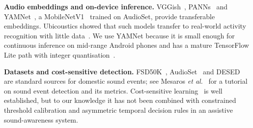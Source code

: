 \documentclass[conference]{IEEEtran}
\begin{document}
\textbf{Audio embeddings and on-device inference.} VGGish~\cite{hershey2017}, PANNs~\cite{kong2020} and YAMNet~\cite{yamnet}, a MobileNetV1~\cite{howard2017} trained on AudioSet, provide transferable embeddings. Ubicoustics showed that such models transfer to real-world activity recognition with little data~\cite{laput2018}. We use YAMNet because it is small enough for continuous inference on mid-range Android phones and has a mature TensorFlow Lite path with integer quantisation~\cite{jacob2018}.

\textbf{Datasets and cost-sensitive detection.} FSD50K~\cite{fonseca2022}, AudioSet~\cite{gemmeke2017} and DESED~\cite{turpault2019} are standard sources for domestic sound events; see Mesaros \emph{et al.}~\cite{mesaros2021} for a tutorial on sound event detection and its metrics. Cost-sensitive learning~\cite{elkan2001} is well established, but to our knowledge it has not been combined with constrained threshold calibration and asymmetric temporal decision rules in an assistive sound-awareness system.

\end{document}
